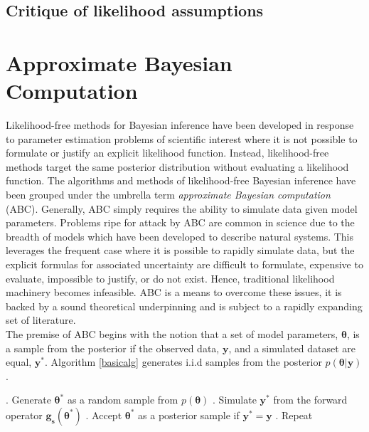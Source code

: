 \subsection{Critique of likelihood assumptions}



\section{Approximate Bayesian Computation}

Likelihood-free methods for Bayesian inference have been developed in response to parameter estimation problems of scientific interest where it is not possible to formulate or justify an explicit likelihood function. Instead, likelihood-free methods target the same posterior distribution without evaluating a likelihood function. The algorithms and methods of likelihood-free Bayesian inference have been grouped under the umbrella term \textit{approximate Bayesian computation} (ABC). Generally, ABC simply requires the ability to simulate data given model parameters. Problems ripe for attack by ABC are common in science due to the breadth of models which have been developed to describe natural systems. This leverages the frequent case where it is possible to rapidly simulate data, but the explicit formulas for associated uncertainty are difficult to formulate, expensive to evaluate, impossible to justify, or do not exist. Hence, traditional likelihood machinery becomes infeasible. ABC is a means to overcome these issues, it is backed by a sound theoretical underpinning and is subject to a rapidly expanding set of literature. \\

The premise of ABC begins with the notion that a set of model parameters, $\bm{\theta}$, is a sample from the posterior if the observed data, $\bm{y}$, and a simulated dataset are equal, $\bm{y^*}$. Algorithm \ref{basicalg} generates i.i.d samples from the posterior $p(\bm{\theta}|\bm{y})$.

\begin{algorithm}[H]
	\caption{ }
	\begin{algorithmic}
		. Generate $\bm{\theta^*}$ as a random sample from $p(\bm{\theta})$		
		. Simulate $\bm{y^*}$ from the forward operator $\bm{g_s}(\bm{\theta^*})$		
		. Accept $\bm{\theta^*}$ as a posterior sample if $\bm{y^*} = \bm{y}$		
		. Repeat
	\end{algorithmic}
	\label{basicalg}
\end{algorithm}

